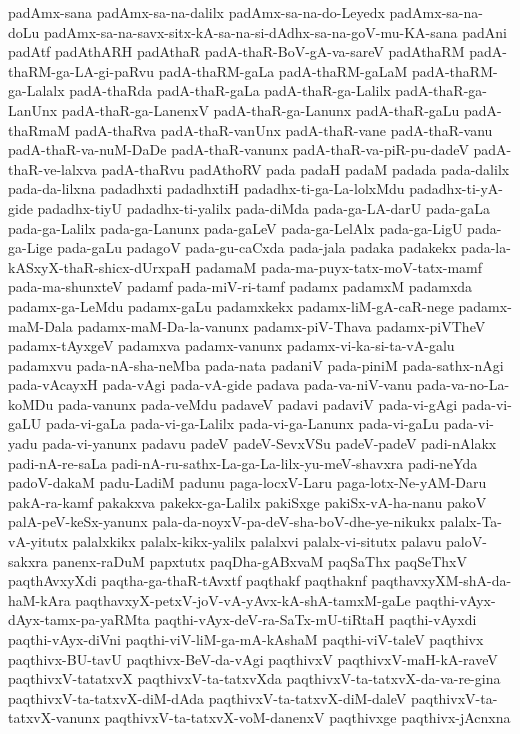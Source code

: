 {padAmx-sana
padAmx-sa-na-dalilx
padAmx-sa-na-do-Leyedx
padAmx-sa-na-doLu
padAmx-sa-na-savx-sitx-kA-sa-na-si-dAdhx-sa-na-goV-mu-KA-sana
padAni
padAtf
padAthARH
padAthaR
padA-thaR-BoV-gA-va-sareV
padAthaRM
padA-thaRM-ga-LA-gi-paRvu
padA-thaRM-gaLa
padA-thaRM-gaLaM
padA-thaRM-ga-Lalalx
padA-thaRda
padA-thaR-gaLa
padA-thaR-ga-Lalilx
padA-thaR-ga-LanUnx
padA-thaR-ga-LanenxV
padA-thaR-ga-Lanunx
padA-thaR-gaLu
padA-thaRmaM
padA-thaRva
padA-thaR-vanUnx
padA-thaR-vane
padA-thaR-vanu
padA-thaR-va-nuM-DaDe
padA-thaR-vanunx
padA-thaR-va-piR-pu-dadeV
padA-thaR-ve-lalxva
padA-thaRvu
padAthoRV
pada
padaH
padaM
padada
pada-dalilx
pada-da-lilxna
padadhxti
padadhxtiH
padadhx-ti-ga-La-lolxMdu
padadhx-ti-yA-gide
padadhx-tiyU
padadhx-ti-yalilx
pada-diMda
pada-ga-LA-darU
pada-gaLa
pada-ga-Lalilx
pada-ga-Lanunx
pada-gaLeV
pada-ga-LelAlx
pada-ga-LigU
pada-ga-Lige
pada-gaLu
padagoV
pada-gu-caCxda
pada-jala
padaka
padakekx
pada-la-kASxyX-thaR-shicx-dUrxpaH
padamaM
pada-ma-puyx-tatx-moV-tatx-mamf
pada-ma-shunxteV
padamf
pada-miV-ri-tamf
padamx
padamxM
padamxda
padamx-ga-LeMdu
padamx-gaLu
padamxkekx
padamx-liM-gA-caR-nege
padamx-maM-Dala
padamx-maM-Da-la-vanunx
padamx-piV-Thava
padamx-piVTheV
padamx-tAyxgeV
padamxva
padamx-vanunx
padamx-vi-ka-si-ta-vA-galu
padamxvu
pada-nA-sha-neMba
pada-nata
padaniV
pada-piniM
pada-sathx-nAgi
pada-vAcayxH
pada-vAgi
pada-vA-gide
padava
pada-va-niV-vanu
pada-va-no-La-koMDu
pada-vanunx
pada-veMdu
padaveV
padavi
padaviV
pada-vi-gAgi
pada-vi-gaLU
pada-vi-gaLa
pada-vi-ga-Lalilx
pada-vi-ga-Lanunx
pada-vi-gaLu
pada-vi-yadu
pada-vi-yanunx
padavu
padeV
padeV-SevxVSu
padeV-padeV
padi-nAlakx
padi-nA-re-saLa
padi-nA-ru-sathx-La-ga-La-lilx-yu-meV-shavxra
padi-neYda
padoV-dakaM
padu-LadiM
padunu
paga-locxV-Laru
paga-lotx-Ne-yAM-Daru
pakA-ra-kamf
pakakxva
pakekx-ga-Lalilx
pakiSxge
pakiSx-vA-ha-nanu
pakoV
palA-peV-keSx-yanunx
pala-da-noyxV-pa-deV-sha-boV-dhe-ye-nikukx
palalx-Ta-vA-yitutx
palalxkikx
palalx-kikx-yalilx
palalxvi
palalx-vi-situtx
palavu
paloV-sakxra
panenx-raDuM
papxtutx
paqDha-gABxvaM
paqSaThx
paqSeThxV
paqthAvxyXdi
paqtha-ga-thaR-tAvxtf
paqthakf
paqthaknf
paqthavxyXM-shA-da-haM-kAra
paqthavxyX-petxV-joV-vA-yAvx-kA-shA-tamxM-gaLe
paqthi-vAyx-dAyx-tamx-pa-yaRMta
paqthi-vAyx-deV-ra-SaTx-mU-tiRtaH
paqthi-vAyxdi
paqthi-vAyx-diVni
paqthi-viV-liM-ga-mA-kAshaM
paqthi-viV-taleV
paqthivx
paqthivx-BU-tavU
paqthivx-BeV-da-vAgi
paqthivxV
paqthivxV-maH-kA-raveV
paqthivxV-tatatxvX
paqthivxV-ta-tatxvXda
paqthivxV-ta-tatxvX-da-va-re-gina
paqthivxV-ta-tatxvX-diM-dAda
paqthivxV-ta-tatxvX-diM-daleV
paqthivxV-ta-tatxvX-vanunx
paqthivxV-ta-tatxvX-voM-danenxV
paqthivxge
paqthivx-jAcnxna
}
